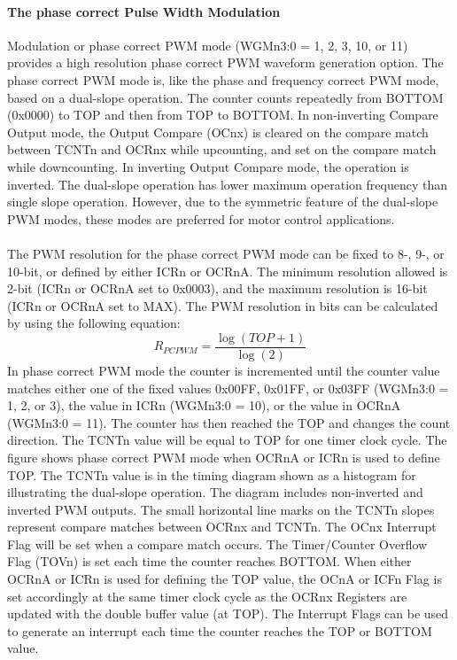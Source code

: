 \documentclass[english]{article}
\begin{document}
\paragraph{The phase correct Pulse Width Modulation} Modulation or phase correct PWM mode (WGMn3:0 = 1, 2, 3, 10, or 11) provides a high resolution phase correct PWM waveform generation option. The
phase correct PWM mode is, like the phase and frequency correct PWM mode, based on a dual-slope operation. The counter counts repeatedly from BOTTOM (0x0000) to TOP and then from TOP to BOTTOM. In non-inverting Compare Output mode, the Output Compare (OCnx) is cleared on the compare match between TCNTn and OCRnx while upcounting, and set on the compare match while downcounting. In inverting Output Compare mode, the operation is inverted. The dual-slope operation has lower maximum operation frequency than single slope operation. However, due to the symmetric feature of the dual-slope PWM modes, these modes are preferred for motor control applications.\\\\
The PWM resolution for the phase correct PWM mode can be fixed to 8-, 9-, or 10-bit, or defined by either ICRn or OCRnA. The minimum resolution allowed is 2-bit (ICRn or OCRnA set to 0x0003), and the maximum resolution is 16-bit (ICRn or OCRnA set to MAX). The PWM resolution in bits can be calculated by using the following equation:
$$
R_{PCPWM}=\frac{\log(TOP+1)}{\log(2)}
$$
In phase correct PWM mode the counter is incremented until the counter value matches either
one of the fixed values 0x00FF, 0x01FF, or 0x03FF (WGMn3:0 = 1, 2, or 3), the value in ICRn (WGMn3:0 = 10), or the value in OCRnA (WGMn3:0 = 11). The counter has then reached the TOP and changes the count direction. The TCNTn value will be equal to TOP for one timer clock cycle. The figure shows phase correct PWM mode when OCRnA or ICRn is used to define TOP. The TCNTn value is in the timing diagram shown as a histogram for illustrating the dual-slope operation. The diagram includes non-inverted and inverted PWM outputs. The small horizontal line marks on the TCNTn slopes represent compare matches between OCRnx and TCNTn. The OCnx Interrupt Flag will be set when a compare match occurs.
The Timer/Counter Overflow Flag (TOVn) is set each time the counter reaches BOTTOM. When either OCRnA or ICRn is used for defining the TOP value, the OCnA or ICFn Flag is set accordingly at the same timer clock cycle as the OCRnx Registers are updated with the double buffer value (at TOP). The Interrupt Flags can be used to generate an interrupt each time the counter reaches the TOP or BOTTOM value.\\\\
\end{document}
